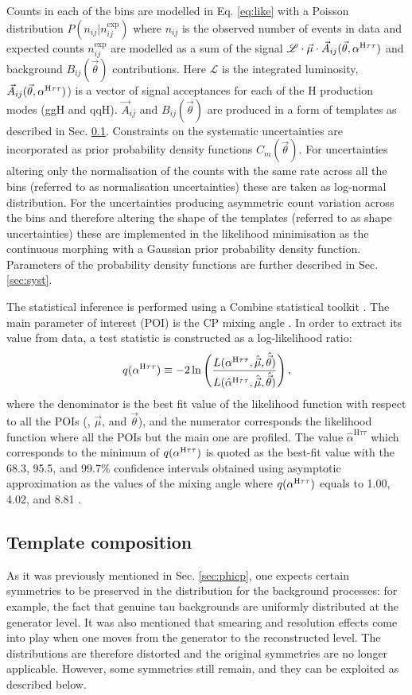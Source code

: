 Counts in each of the bins are modelled in Eq. \ref{eq:like} with a Poisson distribution $P(n_{ij}|n_{ij}^\text{exp})$ where $n_{ij}$ is the observed number of events in data and expected counts $n_{ij}^\text{exp}$ are modelled as a sum of the signal $\mathcal{L} \cdot \vec{\mu} \cdot \vec{A}_{ij}(\vec{\theta}, \alpha^{\text{H}\tau\tau})$ and background $B_{ij}(\vec{\theta})$ contributions. Here $\mathcal{L}$ is the integrated luminosity, $\vec{A}_{ij}(\vec{\theta}, \alpha^{\text{H}\tau\tau})$) is a vector of signal acceptances for each of the H production modes (ggH and qqH). $\vec{A}_{ij}$ and $B_{ij}(\vec{\theta})$ are produced in a form of templates as described in Sec. \ref{sec:temp}. Constraints on the systematic uncertainties are incorporated as prior probability density functions $C_m(\vec{\theta})$. For uncertainties altering only the normalisation of the counts with the same rate across all the bins (referred to as normalisation uncertainties) these are taken as log-normal distribution. For the uncertainties producing asymmetric count variation across the bins and therefore altering the shape of the templates (referred to as shape uncertainties) these are implemented in the likelihood minimisation as the continuous morphing with a Gaussian prior probability density
function. Parameters of the probability density functions are further described in Sec. \ref{sec:syst}.

The statistical inference is performed using a Combine statistical toolkit \cite{combine}. The main parameter of interest (POI) is the CP mixing angle \mixa. In order to extract its value from data, a test statistic is constructed as a log-likelihood ratio:
\begin{equation}
    q(\alpha^{\text{H}\tau\tau}) \equiv -2\ln\left(\dfrac{L(\alpha^{\text{H}\tau\tau}, \hat{\vec{\mu}}, \hat{\vec{\theta}})}{L(\hat{\alpha}^{\text{H}\tau\tau}, \hat{\vec{\mu}}, \hat{\vec{\theta}})}\right),
\end{equation}
where the denominator is the best fit value of the likelihood function with respect to all the POIs (\mixa, $\vec{\mu}$, and $\vec{\theta}$), and the numerator corresponds the likelihood function where all the POIs but the main one are profiled. The value $\hat{\alpha}^{\text{H}\tau\tau}$ which corresponds to the minimum of $q(\alpha^{\text{H}\tau\tau})$ is quoted as the best-fit value with the 68.3, 95.5, and 99.7\% confidence intervals obtained using asymptotic approximation as the values of the mixing angle \mixa where $q(\alpha^{\text{H}\tau\tau})$ equals to 1.00, 4.02, and 8.81 \cite{Cowan:2010js}.

\subsection{Template composition}\label{sec:temp}
As it was previously mentioned in Sec. \ref{sec:phicp}, one expects certain symmetries to be preserved in the \phicp distribution for the background processes: for example, the fact that genuine tau backgrounds are uniformly distributed at the generator level. It was also mentioned that smearing and resolution effects come into play when one moves from the generator to the reconstructed level. The distributions are therefore distorted and the original symmetries are no longer applicable. However, some symmetries still remain, and they can be exploited as described below.

